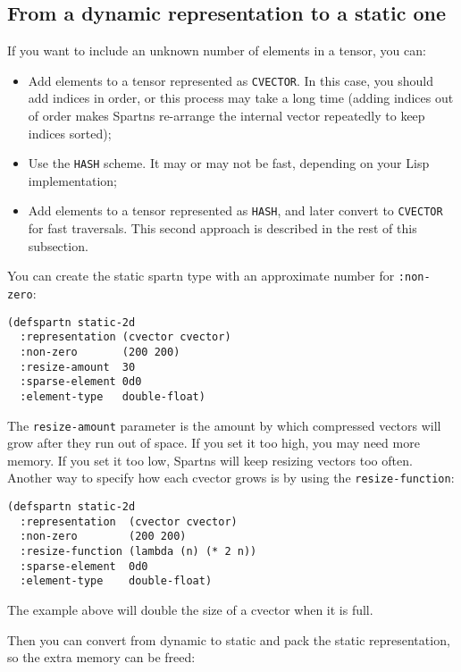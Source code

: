 \documentclass{article}
\begin{document}
\subsection{From a dynamic representation to a static one}

If you want to include an unknown number of elements in a tensor, you can:

\begin{itemize}
\item Add elements to a tensor represented as \verb+CVECTOR+. In this case,
      you should add indices in order, or this process may take a long time
      (adding indices out of order makes Spartns re-arrange the internal vector
      repeatedly to keep indices sorted);
\item Use the \verb+HASH+ scheme. It may or may not be fast, depending on your
      Lisp implementation;
\item Add elements to a tensor represented as \verb+HASH+, and later convert to
      \verb+CVECTOR+ for fast traversals. This second approach is described in the
      rest of this subsection.
\end{itemize}

You can create the static spartn type with an approximate number for \verb+:non-zero+:

\begin{lstlisting}
(defspartn static-2d
  :representation (cvector cvector)
  :non-zero       (200 200)
  :resize-amount  30
  :sparse-element 0d0
  :element-type   double-float)
\end{lstlisting}

The \verb+resize-amount+ parameter is the amount by which compressed vectors will
grow after they run out of space. If you set it too high, you may need more memory.
If you set it too low, Spartns will keep resizing vectors too often. Another
way to specify how each cvector grows is by using the \verb+resize-function+:

\begin{lstlisting}
(defspartn static-2d
  :representation  (cvector cvector)
  :non-zero        (200 200)
  :resize-function (lambda (n) (* 2 n))
  :sparse-element  0d0
  :element-type    double-float)
\end{lstlisting}

The example above will double the size of a cvector when it is full.

Then you can convert from dynamic to static and pack the static representation,
so the extra memory can be freed:
\end{document}
